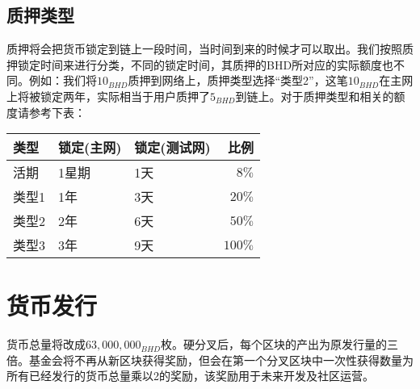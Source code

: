 \subsection{质押类型}
\begin{flushleft}
    质押将会把货币锁定到链上一段时间，当时间到来的时候才可以取出。我们按照质押锁定时间来进行分类，不同的锁定时间，其质押的BHD所对应的实际额度也不同。例如：我们将$10_{BHD}$质押到网络上，质押类型选择``类型2''，这笔$10_{BHD}$在主网上将被锁定两年，实际相当于用户质押了$5_{BHD}$到链上。对于质押类型和相关的额度请参考下表：
\end{flushleft}
\begin{tabular}{ |p{3cm}|p{3cm}|p{3cm}|r| }
    \hline
    \rowcolor{lightgray} 类型 & 锁定(主网) & 锁定(测试网) & 比例 \\[5pt]
    \hline
    活期 & 1星期 & 1天 & $8\%$ \\[5pt]
    \rowcolor{lightgray!30} 类型1 & 1年 & 3天 & $20\%$ \\[5pt]
    类型2 & 2年 & 6天 & $50\%$ \\[5pt]
    \rowcolor{lightgray!30} 类型3 & 3年 & 9天 & $100\%$ \\[5pt]
    \hline
\end{tabular}
\section{货币发行}
\begin{flushleft}
    货币总量将改成$63,000,000_{BHD}$枚。硬分叉后，每个区块的产出为原发行量的三倍。基金会将不再从新区块获得奖励，但会在第一个分叉区块中一次性获得数量为所有已经发行的货币总量乘以2的奖励，该奖励用于未来开发及社区运营。
\end{flushleft}

